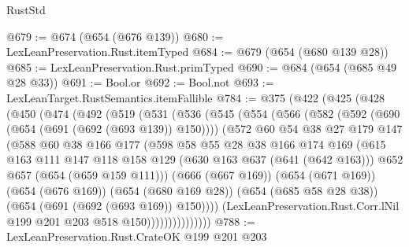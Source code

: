 \begin{lexlean}{RustStd}
\begin{coremodule}
@679 := @674 (@654 (@676 @139))
@680 := LexLeanPreservation.Rust.itemTyped
@684 := @679 (@654 (@680 @139 @28))
@685 := LexLeanPreservation.Rust.primTyped
@690 := @684 (@654 (@685 @49 @28 @33))
@691 := Bool.or
@692 := Bool.not
@693 := LexLeanTarget.RustSemantics.itemFallible
@784 := @375
    (@422
      (@425
        (@428
          (@450
            (@474
              (@492
                (@519
                  (@531
                    (@536
                      (@545
                        (@554
                          (@566
                            (@582
                              (@592 (@690 (@654 (@691 (@692 (@693 @139)) @150))))
                              (@572
                                @60
                                @54
                                @38
                                @27
                                @179
                                @147
                                (@588
                                  @60
                                  @38
                                  @166
                                  @177
                                  (@598
                                    @58
                                    @55
                                    @28
                                    @38
                                    @166
                                    @174
                                    @169
                                    (@615
                                      @163
                                      @111
                                      @147
                                      @118
                                      @158
                                      @129
                                      (@630 @163 @637 (@641 (@642 @163)))
                                      @652
                                      @657
                                      (@654 (@659 @159 @111)))
                                    (@666 (@667 @169))
                                    (@654 (@671 @169))
                                    (@654 (@676 @169))
                                    (@654 (@680 @169 @28))
                                    (@654 (@685 @58 @28 @38))
                                    (@654 (@691 (@692 (@693 @169)) @150))))
                                (LexLeanPreservation.Rust.Corr.lNil
                                  @199
                                  @201
                                  @203
                                  @518
                                  @150)))))))))))))))
@788 := LexLeanPreservation.Rust.CrateOK @199 @201 @203

\end{coremodule}
\end{lexlean}
